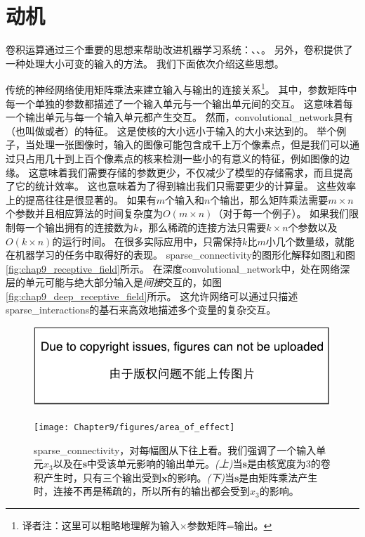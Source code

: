  
\section{动机}
\label{sec:motivation}

卷积运算通过三个重要的思想来帮助改进机器学习系统：、、。
另外，卷积提供了一种处理大小可变的输入的方法。
我们下面依次介绍这些思想。

传统的神经网络使用矩阵乘法来建立输入与输出的连接关系\footnote{译者注：这里可以粗略地理解为输入$\times$参数矩阵=输出。}。
其中，参数矩阵中每一个单独的参数都描述了一个输入单元与一个输出单元间的交互。
这意味着每一个输出单元与每一个输入单元都产生交互。
然而，\gls{convolutional_network}具有（也叫做或者）的特征。
这是使核的大小远小于输入的大小来达到的。
举个例子，当处理一张图像时，输入的图像可能包含成千上万个像素点，但是我们可以通过只占用几十到上百个像素点的核来检测一些小的有意义的特征，例如图像的边缘。
这意味着我们需要存储的参数更少，不仅减少了模型的存储需求，而且提高了它的统计效率。
这也意味着为了得到输出我们只需要更少的计算量。
这些效率上的提高往往是很显著的。
如果有$m$个输入和$n$个输出，那么矩阵乘法需要$m \times n$个参数并且相应算法的时间复杂度为$O(m\times n)$（对于每一个例子）。
如果我们限制每一个输出拥有的连接数为$k$，那么稀疏的连接方法只需要$k\times n$个参数以及$O(k\times n)$的运行时间。
在很多实际应用中，只需保持$k$比$m$小几个数量级，就能在机器学习的任务中取得好的表现。
\gls{sparse_connectivity}的图形化解释如图\ref{fig:chap9_area_of_effect}和图\ref{fig:chap9_receptive_field}所示。
在深度\gls{convolutional_network}中，处在网络深层的单元可能与绝大部分输入是\emph{间接}交互的，如图\ref{fig:chap9_deep_receptive_field}所示。
这允许网络可以通过只描述\gls{sparse_interactions}的基石来高效地描述多个变量的复杂交互。
\begin{figure}[!htb]
\ifOpenSource
\centerline{\includegraphics{figure.pdf}}
\else
\centerline{\texttt{[image: Chapter9/figures/area\_of\_effect]}}
\fi
\captionsetup{singlelinecheck=off}
\caption[Caption for LOF]{\gls{sparse_connectivity}，对每幅图从下往上看。我们强调了一个输入单元$x_3$以及在$\bm{s}$中受该单元影响的输出单元。\emph{(上)}当$\bm{s}$是由核宽度为3的卷积产生时，只有三个输出受到$\bm{x}$的影响\protect\footnotemark。\emph{(下)}当$\bm{s}$是由矩阵乘法产生时，连接不再是稀疏的，所以所有的输出都会受到$x_3$的影响。}
\label{fig:chap9_area_of_effect}
\end{figure}

